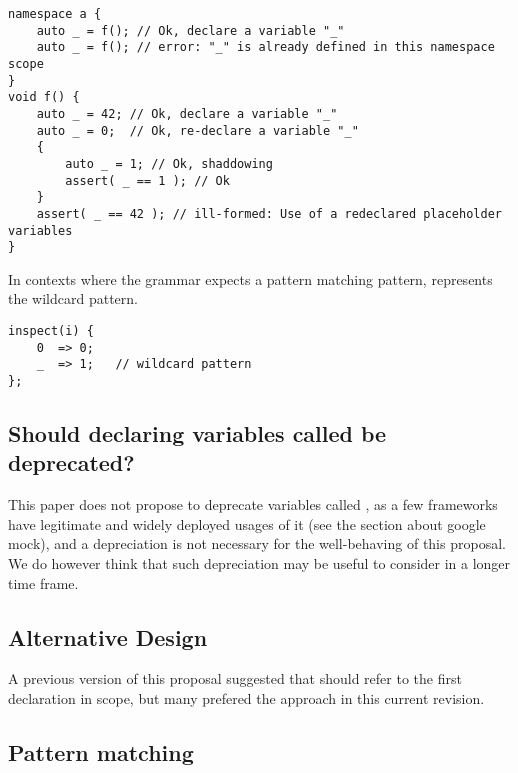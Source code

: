 \documentclass{wg21}
\begin{document}
\begin{example}
\begin{lstlisting}[style=color]
namespace a {
    auto _ = f(); // Ok, declare a variable "_"
    auto _ = f(); // error: "_" is already defined in this namespace scope
}
void f() {
    auto _ = 42; // Ok, declare a variable "_"
    auto _ = 0;  // Ok, re-declare a variable "_"
    {
        auto _ = 1; // Ok, shaddowing
        assert( _ == 1 ); // Ok
    }
    assert( _ == 42 ); // ill-formed: Use of a redeclared placeholder variables
}
\end{lstlisting}
\end{example}

In contexts where the grammar expects a pattern matching pattern, \tcode{_} represents the wildcard pattern.

\begin{lstlisting}[style=color]
inspect(i) {   
    0  => 0;
    _  => 1;   // wildcard pattern
};
\end{lstlisting}

\subsection{Should declaring variables called \tcode{_} be deprecated?}

This paper does not propose to deprecate variables called \tcode{_}, as a few frameworks have legitimate and widely deployed usages of it
(see the section about google mock), and a depreciation is not necessary for the well-behaving of this proposal.
We do however think that such depreciation may be useful to consider in a longer time frame.

\subsection{Alternative Design}

A previous version of this proposal suggested that \tcode{_} should refer to the first declaration in scope,
but many prefered the approach in this current revision.  

\subsection{Pattern matching}
\end{document}
